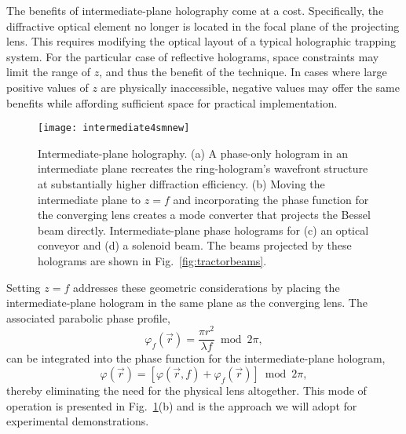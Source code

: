 The benefits of intermediate-plane holography come at
a cost.  Specifically, the diffractive optical element no
longer is located in the focal plane of the projecting
lens.  This requires modifying the optical layout of a typical
holographic trapping system.
For the particular case of reflective holograms,
space constraints may limit the range of $z$,
and thus the benefit of the technique.
In cases where large positive values of $z$ are 
physically inaccessible,
negative values may offer the same benefits while
affording sufficient space for practical implementation.

\begin{figure}[t!]
  \centering
  \texttt{[image: intermediate4smnew]}
  \caption{Intermediate-plane holography. 
    (a) A phase-only hologram
    in an intermediate plane recreates the ring-hologram's
    wavefront structure at substantially higher diffraction efficiency.
    (b) Moving the intermediate plane to $z = f$ and incorporating
    the phase function for the converging lens
    creates a mode converter that projects the Bessel beam directly.
    Intermediate-plane phase holograms for
    (c) an optical conveyor and (d) a solenoid beam.  The beams
    projected by these holograms are shown in Fig.~\ref{fig:tractorbeams}.}
  \label{fig:intermediate}
\end{figure}

Setting $z = f$ addresses these geometric considerations
by placing the intermediate-plane hologram
in the same plane as the converging lens.
The associated parabolic phase profile,
\begin{equation}
  \label{eq:lensphase}
  \varphi_f(\vec{r}) = \frac{\pi r^2}{\lambda f}
  \bmod 2 \pi,
\end{equation}
can be integrated into the phase function
for the intermediate-plane hologram, 
\begin{equation}
  \label{eq:complete}
  \varphi(\vec{r}) 
  =
  \left[\varphi(\vec{r},f) +
  \varphi_f(\vec{r}) \right]
  \bmod 2 \pi, 
\end{equation}
thereby eliminating the need for
the physical lens altogether.
This mode of operation is presented in
Fig.~\ref{fig:intermediate}(b) and is the
approach we will adopt for experimental demonstrations.

